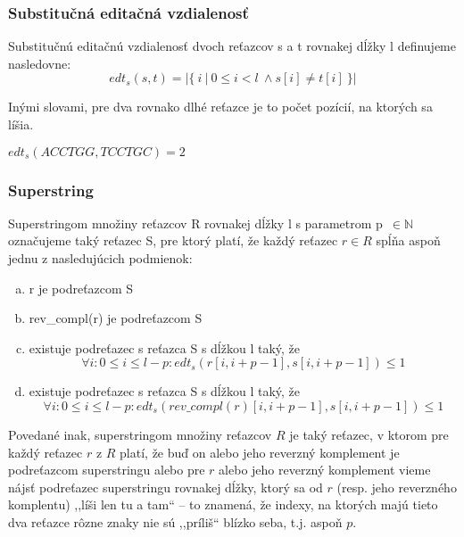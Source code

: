 \subsubsection{Substitučná editačná vzdialenosť}
\begin{defn}
Substitučnú editačnú vzdialenosť dvoch reťazcov s a t rovnakej dĺžky l definujeme nasledovne:
$$
edt_s(s, t) = \left\vert{ \{~i~|~0 \leq i < l~\land s[i] \neq t[i] ~\} }\right\vert
$$
\end{defn}

Inými slovami, pre dva rovnako dlhé reťazce je to počet pozícií, na ktorých sa líšia.

\begin{example}
$edt_s(ACCTGG, TCCTGC) = 2$
\end{example}

\subsubsection{Superstring}
\begin{defn}
Superstringom množiny reťazcov R rovnakej dĺžky l s parametrom p~$\in \mathbb{N}$ označujeme taký reťazec S, pre ktorý platí, že každý reťazec $r \in R$ spĺňa aspoň jednu z nasledujúcich podmienok:
    \begin{enumerate}[(a)]
    \item r je podreťazcom S
    \item rev\_compl(r) je podreťazcom S
    \item existuje podreťazec s reťazca S s dĺžkou l taký, že 
    $$
    \forall i : 0 \leq i \leq l - p : edt_s(r[i, i+p-1], s[i, i+p-1]) \leq 1
    $$
    \item existuje podreťazec s reťazca S s dĺžkou l taký, že 
    $$
    \forall i : 0 \leq i \leq l - p : edt_s(rev\_compl(r)[i, i+p-1], s[i, i+p-1]) \leq 1
    $$    
    \end{enumerate}

\end{defn}

Povedané inak, superstringom množiny reťazcov $R$ je taký reťazec, v ktorom pre každý reťazec $r$ z $R$ platí, že buď on alebo jeho reverzný komplement je podreťazcom superstringu alebo pre $r$ alebo jeho reverzný komplement vieme nájsť podreťazec superstringu rovnakej dĺžky, ktorý sa od $r$ (resp. jeho reverzného komplentu) ,,líši len tu a tam`` -- to znamená, že indexy, na ktorých majú tieto dva reťazce rôzne znaky nie sú ,,príliš`` blízko seba, t.j. aspoň $p$.


